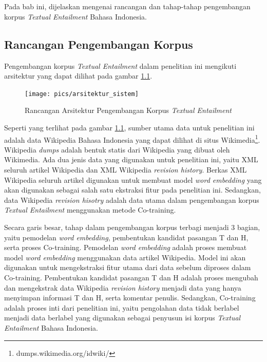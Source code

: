 \chapter{\babTiga}
Pada bab ini, dijelaskan mengenai rancangan dan tahap-tahap pengembangan korpus \textit{Textual Entailment} Bahasa Indonesia. 

\section{Rancangan Pengembangan Korpus}
Pengembangan korpus \textit{Textual Entailment} dalam penelitian ini mengikuti arsitektur yang dapat dilihat pada gambar \ref{fig:arsitektur_sistem}.
\begin{figure}
  \centering
  \texttt{[image: pics/arsitektur\_sistem]}
  \caption{Rancangan Arsitektur Pengembangan Korpus \textit{Textual Entailment}}
  \label{fig:arsitektur_sistem}
\end{figure}
\noindent Seperti yang terlihat pada gambar \ref{fig:arsitektur_sistem}, sumber utama data untuk penelitian ini adalah data Wikipedia Bahasa Indonesia yang dapat dilihat di situs Wikimedia\footnote{dumps.wikimedia.org/idwiki/}. Wikipedia \textit{dumps} adalah bentuk statis dari Wikipedia yang dibuat oleh Wikimedia. Ada dua jenis data yang digunakan untuk penelitian ini, yaitu XML seluruh artikel Wikipedia dan XML Wikipedia \textit{revision history}. Berkas XML Wikipedia seluruh artikel digunakan untuk membuat model \textit{word embedding} yang akan digunakan sebagai salah satu ekstraksi fitur pada penelitian ini. Sedangkan, data Wikipedia \textit{revision hisotry} adalah data utama dalam pengembangan korpus \textit{Textual Entailment} menggunakan metode Co-training. 

Secara garis besar, tahap dalam pengembangan korpus terbagi menjadi 3 bagian, yaitu pemodelan \textit{word embedding}, pembentukan kandidat pasangan T dan H, serta proses Co-training. Pemodelan \textit{word embedding} adalah proses membuat model \textit{word embedding} menggunakan data artikel Wikipedia. Model ini akan digunakan untuk mengekstraksi fitur utama dari data sebelum diproses dalam Co-training. Pembentukan kandidat pasangan T dan H adalah proses mengubah dan mengekstrak data Wikipedia \textit{revision history} menjadi data yang hanya menyimpan informasi T dan H, serta komentar penulis. Sedangkan, Co-training adalah proses inti dari penelitian ini, yaitu pengolahan data tidak berlabel menjadi data berlabel yang digunakan sebagai penyusun isi korpus \textit{Textual Entailment} Bahasa Indonesia. 


